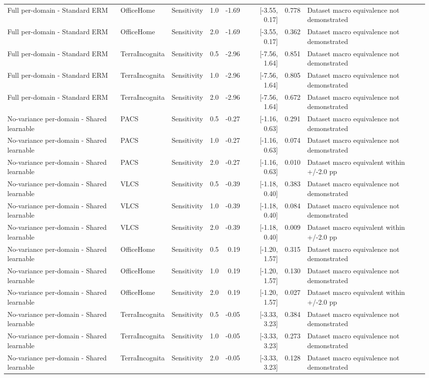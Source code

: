 \begin{tabular}{llp{2.8cm}rrrrp{4.0cm}}
Full per-domain - Standard ERM & OfficeHome & Sensitivity & 1.0 & -1.69 & [-3.55, 0.17] & 0.778 & Dataset macro equivalence not demonstrated \\
Full per-domain - Standard ERM & OfficeHome & Sensitivity & 2.0 & -1.69 & [-3.55, 0.17] & 0.362 & Dataset macro equivalence not demonstrated \\
Full per-domain - Standard ERM & TerraIncognita & Sensitivity & 0.5 & -2.96 & [-7.56, 1.64] & 0.851 & Dataset macro equivalence not demonstrated \\
Full per-domain - Standard ERM & TerraIncognita & Sensitivity & 1.0 & -2.96 & [-7.56, 1.64] & 0.805 & Dataset macro equivalence not demonstrated \\
Full per-domain - Standard ERM & TerraIncognita & Sensitivity & 2.0 & -2.96 & [-7.56, 1.64] & 0.672 & Dataset macro equivalence not demonstrated \\
No-variance per-domain - Shared learnable & PACS & Sensitivity & 0.5 & -0.27 & [-1.16, 0.63] & 0.291 & Dataset macro equivalence not demonstrated \\
No-variance per-domain - Shared learnable & PACS & Sensitivity & 1.0 & -0.27 & [-1.16, 0.63] & 0.074 & Dataset macro equivalence not demonstrated \\
No-variance per-domain - Shared learnable & PACS & Sensitivity & 2.0 & -0.27 & [-1.16, 0.63] & 0.010 & Dataset macro equivalent within +/-2.0 pp \\
No-variance per-domain - Shared learnable & VLCS & Sensitivity & 0.5 & -0.39 & [-1.18, 0.40] & 0.383 & Dataset macro equivalence not demonstrated \\
No-variance per-domain - Shared learnable & VLCS & Sensitivity & 1.0 & -0.39 & [-1.18, 0.40] & 0.084 & Dataset macro equivalence not demonstrated \\
No-variance per-domain - Shared learnable & VLCS & Sensitivity & 2.0 & -0.39 & [-1.18, 0.40] & 0.009 & Dataset macro equivalent within +/-2.0 pp \\
No-variance per-domain - Shared learnable & OfficeHome & Sensitivity & 0.5 & 0.19 & [-1.20, 1.57] & 0.315 & Dataset macro equivalence not demonstrated \\
No-variance per-domain - Shared learnable & OfficeHome & Sensitivity & 1.0 & 0.19 & [-1.20, 1.57] & 0.130 & Dataset macro equivalence not demonstrated \\
No-variance per-domain - Shared learnable & OfficeHome & Sensitivity & 2.0 & 0.19 & [-1.20, 1.57] & 0.027 & Dataset macro equivalent within +/-2.0 pp \\
No-variance per-domain - Shared learnable & TerraIncognita & Sensitivity & 0.5 & -0.05 & [-3.33, 3.23] & 0.384 & Dataset macro equivalence not demonstrated \\
No-variance per-domain - Shared learnable & TerraIncognita & Sensitivity & 1.0 & -0.05 & [-3.33, 3.23] & 0.273 & Dataset macro equivalence not demonstrated \\
No-variance per-domain - Shared learnable & TerraIncognita & Sensitivity & 2.0 & -0.05 & [-3.33, 3.23] & 0.128 & Dataset macro equivalence not demonstrated \\
\bottomrule
\end{tabular}
